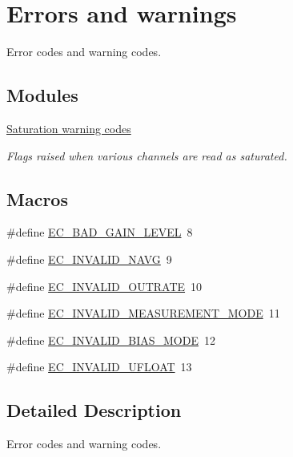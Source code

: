 \hypertarget{group___error_codes}{\section{Errors and warnings}
\label{group___error_codes}
}


Error codes and warning codes.  


\subsection*{Modules}
\begin{DoxyCompactItemize}
\item 
\hyperlink{group___saturation_warning_codes}{Saturation warning codes}
\begin{DoxyCompactList}\small\item\em Flags raised when various channels are read as saturated. \end{DoxyCompactList}\end{DoxyCompactItemize}
\subsection*{Macros}
\begin{DoxyCompactItemize}
\item 
\#define \hyperlink{group___error_codes_ga152836fba63cffc721c652f2afd90166}{E\+C\+\_\+\+B\+A\+D\+\_\+\+G\+A\+I\+N\+\_\+\+L\+E\+V\+E\+L}~8
\item 
\#define \hyperlink{group___error_codes_ga42b9f7389394451cee6febb3dcd8b0a6}{E\+C\+\_\+\+I\+N\+V\+A\+L\+I\+D\+\_\+\+N\+A\+V\+G}~9
\item 
\#define \hyperlink{group___error_codes_gaf34062d8ff8ae1fa0a057c01dceba5b5}{E\+C\+\_\+\+I\+N\+V\+A\+L\+I\+D\+\_\+\+O\+U\+T\+R\+A\+T\+E}~10
\item 
\#define \hyperlink{group___error_codes_gad42b93e29ae1feb1886cd6fed34f029d}{E\+C\+\_\+\+I\+N\+V\+A\+L\+I\+D\+\_\+\+M\+E\+A\+S\+U\+R\+E\+M\+E\+N\+T\+\_\+\+M\+O\+D\+E}~11
\item 
\#define \hyperlink{group___error_codes_ga8d614b9fb1abde4870f56e0d284e5c43}{E\+C\+\_\+\+I\+N\+V\+A\+L\+I\+D\+\_\+\+B\+I\+A\+S\+\_\+\+M\+O\+D\+E}~12
\item 
\#define \hyperlink{group___error_codes_ga419d094458d892d7439a052bf287932d}{E\+C\+\_\+\+I\+N\+V\+A\+L\+I\+D\+\_\+\+U\+F\+L\+O\+A\+T}~13
\end{DoxyCompactItemize}


\subsection{Detailed Description}
Error codes and warning codes. 

